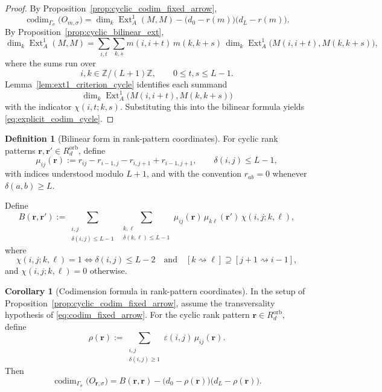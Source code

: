 \documentclass{article}
\newcommand{\codim}{\operatorname{codim}}
\newcommand{\Ext}{\operatorname{Ext}}
\theoremstyle{definition}
\newtheorem{corollary}[theorem]{Corollary}
\newtheorem{definition}[theorem]{Definition}
\begin{document}
\begin{proof}
By Proposition~\ref{prop:cyclic_codim_fixed_arrow},
\[
\codim_{\Gamma_\sigma}\!\bigl(O_{m,\sigma}\bigr)
=
\dim_k\Ext_A^1(M,M)
-\bigl(d_0-r(m)\bigr)\bigl(d_L-r(m)\bigr).
\]
By Proposition~\ref{prop:cyclic_bilinear_ext},
\[
\dim_k\Ext_A^1(M,M)
=
\sum_{i,t}\sum_{k,s}
m(i,i+t)\,m(k,k+s)\,
\dim_k\Ext_A^1\!\big(M(i,i+t),M(k,k+s)\big),
\]
where the sums run over
\[
i,k\in\mathbb Z/(L+1)\mathbb Z,\qquad 0\le t,s\le L-1.
\]
Lemma~\ref{lem:ext1_criterion_cycle} identifies each summand
\[
\dim_k\Ext_A^1\!\big(M(i,i+t),M(k,k+s)\big)
\]
with the indicator $\chi(i,t;k,s)$. Substituting this into the bilinear formula yields
\eqref{eq:explicit_codim_cycle}.
\end{proof}

\begin{definition}[Bilinear form in rank-pattern coordinates]\label{def:bilinear_form_rankpattern}
For cyclic rank patterns \(\mathbf r,\mathbf r'\in R_d^{\mathrm{orb}}\), define
\[
\mu_{ij}(\mathbf r)
:=
r_{ij}-r_{i-1,j}-r_{i,j+1}+r_{i-1,j+1},
\qquad \delta(i,j)\le L-1,
\]
with indices understood modulo \(L+1\), and with the convention \(r_{ab}=0\) whenever \(\delta(a,b)\ge L\).

Define
\[
B(\mathbf r,\mathbf r')
:=
\sum_{\substack{i,j\\ \delta(i,j)\le L-1}}
\ \sum_{\substack{k,\ell\\ \delta(k,\ell)\le L-1}}
\mu_{ij}(\mathbf r)\,\mu_{k\ell}(\mathbf r')\,\chi(i,j;k,\ell),
\]
where
\[
\chi(i,j;k,\ell)=1
\iff
\delta(i,j)\le L-2
\quad\text{and}\quad
[k\rightsquigarrow \ell]\supseteq [j+1\rightsquigarrow i-1],
\]
and \(\chi(i,j;k,\ell)=0\) otherwise.
\end{definition}

\begin{corollary}[Codimension formula in rank-pattern coordinates]\label{cor:compact_codim_rankpattern}
In the setup of Proposition~\ref{prop:cyclic_codim_fixed_arrow}, assume the transversality hypothesis of \eqref{eq:codim_fixed_arrow}. For the cyclic rank pattern \(\mathbf r\in R_d^{\mathrm{orb}}\), define
\[
\rho(\mathbf r)
:=
\sum_{\substack{i,j\\ \delta(i,j)\ge 1}}
\varepsilon(i,j)\,\mu_{ij}(\mathbf r).
\]
Then
\[
\codim_{\Gamma_\sigma}\!\bigl(O_{\mathbf r,\sigma}\bigr)
=
B(\mathbf r,\mathbf r)
-
\bigl(d_0-\rho(\mathbf r)\bigr)\bigl(d_L-\rho(\mathbf r)\bigr).
\]
\end{corollary}
\end{document}

